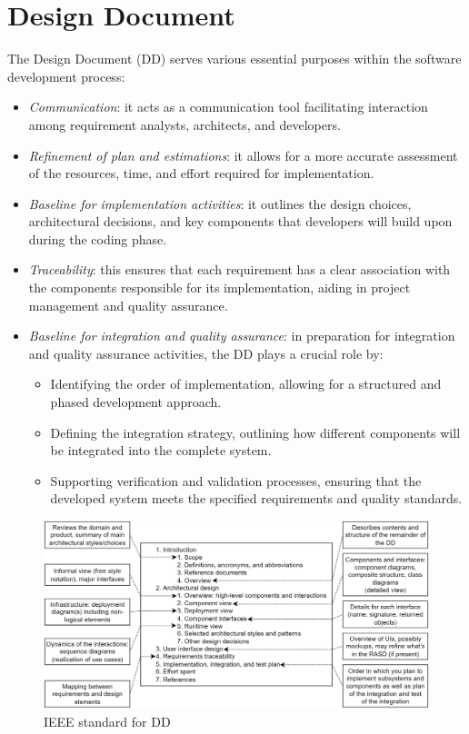 \section{Design Document}

The Design Document (DD) serves various essential purposes within the software development process:
\begin{itemize}
    \item \textit{Communication}: it acts as a communication tool facilitating interaction among requirement analysts, architects, and developers. 
    \item \textit{Refinement of plan and estimations}: it allows for a more accurate assessment of the resources, time, and effort required for implementation.
    \item \textit{Baseline for implementation activities}: it outlines the design choices, architectural decisions, and key components that developers will build upon during the coding phase.
    \item \textit{Traceability}: this ensures that each requirement has a clear association with the components responsible for its implementation, aiding in project management and quality assurance.
    \item \textit{Baseline for integration and quality assurance}: in preparation for integration and quality assurance activities, the DD plays a crucial role by:
        \begin{itemize}
            \item Identifying the order of implementation, allowing for a structured and phased development approach.
            \item Defining the integration strategy, outlining how different components will be integrated into the complete system.
            \item Supporting verification and validation processes, ensuring that the developed system meets the specified requirements and quality standards.
        \end{itemize}
\end{itemize}
\begin{figure}[H]
    \centering
    \includegraphics[width=1\linewidth]{images/dd.png}
    \caption{IEEE standard for DD}
\end{figure}